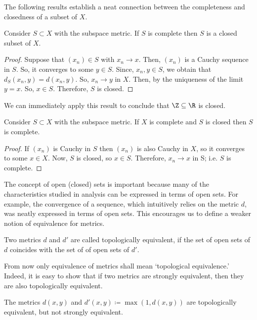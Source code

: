 \documentclass[draft]{penrose}
\begin{document}
The following results establish a neat connection between the completeness and closedness of a subset of $X$.
\begin{nprop}
  Consider $S \subset X$ with the subspace metric. If $S$ is complete then $S$ is a closed subset of $X$.
\end{nprop}
\begin{proof}
  Suppose that $(x_n) \in S$ with $x_n \to x$. Then, $(x_n)$ is a Cauchy sequence in $S$. So, it converges to some $y \in S$. Since, $x_n, y \in S$, we obtain that $d_{S}(x_n, y) = d(x_n, y)$. So, $x_n \to y$ in $X$. Then, by the uniqueness of the limit $y=x$. So, $x \in S$. Therefore, $S$ is closed.
\end{proof}

\begin{negg}
  We can immediately apply this result to conclude that $\Z \subseteq \R$ is closed.
\end{negg}

\begin{nprop}
  Consider $S \subset X$ with the subspace metric. If $X$ is complete and $S$ is closed then $S$ is complete.
\end{nprop}
\begin{proof}
  If $(x_n)$ is Cauchy in $S$ then $(x_n)$ is also Cauchy in $X$, so it converges to some $x \in X$. Now, $S$ is closed, so $x \in S$. Therefore, $x_n \to x$ in S; i.e. $S$ is complete.
\end{proof}

The concept of open (closed) sets is important because many of the characteristics studied in analysis can be expressed in terms of open sets. For example, the convergence of a sequence, which intuitively relies on the metric $d$, was neatly expressed in terms of open sets. This encourages us to define a weaker notion of equivalence for metrics.
\begin{ndfn}
  Two metrics $d$ and $d'$ are called topologically equivalent, if the set of open sets of $d$ coincides with the set of of open sets of $d'$.
\end{ndfn}
From now only equivalence of metrics shall mean `topological equivalence.' Indeed, it is easy to show that if two metrics are strongly equivalent, then they are also topologically equivalent.

\begin{negg}
  The metrics $d(x,y)$ and $d'(x,y) \coloneq \max\left(1, d(x,y)\right)$ are topologically equivalent, but not strongly equivalent.
\end{negg}
\end{document}
